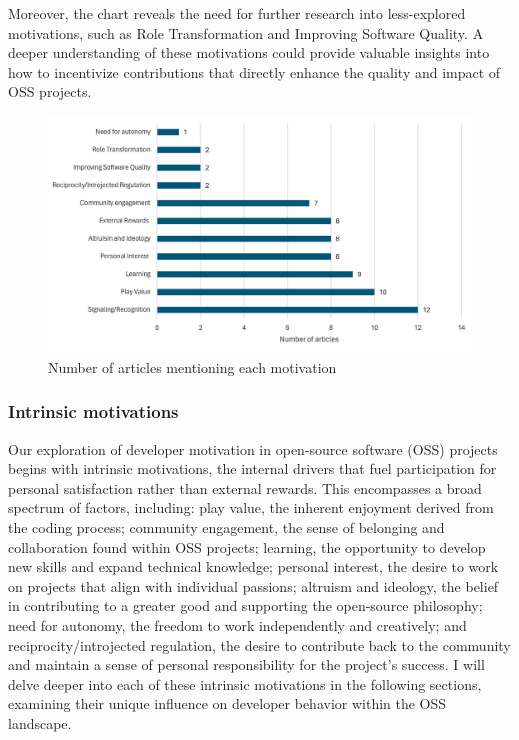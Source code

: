 Moreover, the chart reveals the need for further research into less-explored motivations, such as Role Transformation and Improving Software Quality. A deeper understanding of these motivations could provide valuable insights into how to incentivize contributions that directly enhance the quality and impact of OSS projects.

\begin{figure}[ht]
    \centering
    \includegraphics[width=1\linewidth]{figs/articleMotivationCount.png}
    \caption{Number of articles mentioning each motivation}
    \label{fig:articleMotivationCount}
\end{figure}

\subsubsection{Intrinsic motivations}
Our exploration of developer motivation in open-source software (OSS) projects begins with intrinsic motivations, the internal drivers that fuel participation for personal satisfaction rather than external rewards. This encompasses a broad spectrum of factors, including: play value, the inherent enjoyment derived from the coding process; community engagement, the sense of belonging and collaboration found within OSS projects; learning, the opportunity to develop new skills and expand technical knowledge; personal interest, the desire to work on projects that align with individual passions; altruism and ideology, the belief in contributing to a greater good and supporting the open-source philosophy; need for autonomy, the freedom to work independently and creatively; and reciprocity/introjected regulation, the desire to contribute back to the community and maintain a sense of personal responsibility for the project's success. I will delve deeper into each of these intrinsic motivations in the following sections, examining their unique influence on developer behavior within the OSS landscape.

